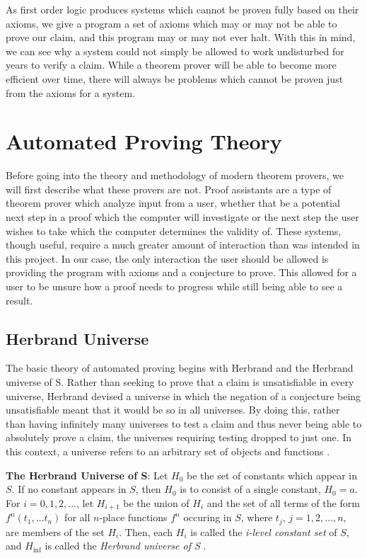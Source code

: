 As first order logic produces systems which cannot be proven fully based on their axioms, we give a program a set of axioms which may or may not be able to prove our claim, and this program may or may not ever halt. With this in mind, we can see why a system could not simply be allowed to work undisturbed for years to verify a claim. While a theorem prover will be able to become more efficient over time, there will always be problems which cannot be proven just from the axioms for a system.

\section{Automated Proving Theory}

Before going into the theory and methodology of modern theorem provers, we will first describe what these provers are not. Proof assistants are a type of theorem prover which analyze input from a user, whether that be a potential next step in a proof which the computer will investigate or the next step the user wishes to take which the computer determines the validity of. These systems, though useful, require a much greater amount of interaction than was intended in this project. In our case, the only interaction the user should be allowed is providing the program with axioms and a conjecture to prove. This allowed for a user to be unsure how a proof needs to progress while still being able to see a result.

\subsection{Herbrand Universe}
The basic theory of automated proving begins with Herbrand and the Herbrand universe of S. Rather than seeking to prove that a claim is unsatisfiable in every universe, Herbrand devised a universe in which the negation of a conjecture being unsatisfiable meant that it would be so in all universes. By doing this, rather than having infinitely many universes to test a claim and thus never being able to absolutely prove a claim, the universes requiring testing dropped to just one. In this context, a universe refers to an arbitrary set of objects and functions \cite{gelfond1988stable}.

\begin{definition}

	\textbf{The Herbrand Universe of S}: Let $H_0$ be the set of constants which appear in $S$. If no constant appears in $S$, then $H_0$ is to consist of a single constant, $H_0 = {a}$. For $i = 0, 1, 2, \ldots $, let $H_{i+1}$ be the union of $H_i$ and the set of all terms of the form $f^n(t_1, \ldots t_n)$ for all $n$-place functions $f^n$ occuring in $S$, where $t_j$, $j=1, 2, \ldots , n$, are members of the set $H_i$. Then, each $H_i$ is called the \textit{i-level constant set} of $S$, and $H_{\inf} $ is called the \textit{Herbrand universe of S} \cite{changLee}.


\end{definition}

